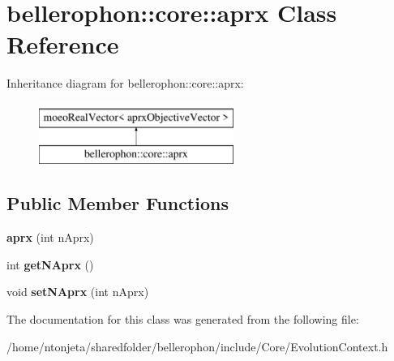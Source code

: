 \hypertarget{classbellerophon_1_1core_1_1aprx}{}\section{bellerophon\+:\+:core\+:\+:aprx Class Reference}
\label{classbellerophon_1_1core_1_1aprx}
Inheritance diagram for bellerophon\+:\+:core\+:\+:aprx\+:\begin{figure}[H]
\begin{center}
\leavevmode
\includegraphics[height=2.000000cm]{classbellerophon_1_1core_1_1aprx}
\end{center}
\end{figure}
\subsection*{Public Member Functions}
\begin{DoxyCompactItemize}
\item 
\hypertarget{classbellerophon_1_1core_1_1aprx_aafee560c00eee20247dafa9a7a385c0e}{}\label{classbellerophon_1_1core_1_1aprx_aafee560c00eee20247dafa9a7a385c0e} 
{\bfseries aprx} (int n\+Aprx)
\item 
\hypertarget{classbellerophon_1_1core_1_1aprx_a1d11776015d1c42764bf30e7e627858a}{}\label{classbellerophon_1_1core_1_1aprx_a1d11776015d1c42764bf30e7e627858a} 
int {\bfseries get\+N\+Aprx} ()
\item 
\hypertarget{classbellerophon_1_1core_1_1aprx_a1c77803b9d4a481c81be2607bd1473dd}{}\label{classbellerophon_1_1core_1_1aprx_a1c77803b9d4a481c81be2607bd1473dd} 
void {\bfseries set\+N\+Aprx} (int n\+Aprx)
\end{DoxyCompactItemize}


The documentation for this class was generated from the following file\+:\begin{DoxyCompactItemize}
\item 
/home/ntonjeta/sharedfolder/bellerophon/include/\+Core/Evolution\+Context.\+h\end{DoxyCompactItemize}
